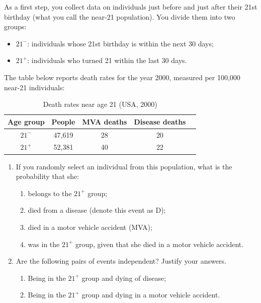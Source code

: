 \documentclass[11pt]{exam}
\begin{document}
\begin{questions}

\question[3]
As a first step, you collect data on individuals just before and just after their 21st birthday (what you call the near-21 population). You divide them into two groups:
\begin{itemize}
    \item \textbf{$21^-$}: individuals whose 21st birthday is within the next 30 days;
    \item \textbf{$21^+$}: individuals who turned 21 within the last 30 days.
\end{itemize}
The table below reports death rates for the year 2000, measured per 100,000 near-21 individuals:
\vspace{-0.2cm}

\begin{table}[ht]
    \centering
    \caption{Death rates near age 21 (USA, 2000)}
    \label{tab:deaths}
    \begin{tabular}{ccccc}
        \toprule
        \textbf{Age group} & \textbf{People} & \textbf{MVA deaths} & \textbf{Disease deaths} \\
        \midrule
        $21^-$ & 47,619 & 28 & 20 \\
        $21^+$ & 52,381 & 40 & 22 \\
        \bottomrule
    \end{tabular}
\end{table}

\begin{enumerate}[label=(\alph*)]
    \item If you randomly select an individual from this population, what is the probability that she:
    \begin{enumerate}[label=(a.\roman*)]
        \item belongs to the $21^+$ group;
        \item died from a disease (denote this event as D);
        \item died in a motor vehicle accident (MVA);
        \item was in the $21^+$ group, given that she died in a motor vehicle accident.
    \end{enumerate}
    
    \item Are the following pairs of events independent? Justify your answers.
    \begin{enumerate}[label=(b.\roman*)]
        \item Being in the $21^+$ group and dying of disease;
        \item Being in the $21^+$ group and dying in a motor vehicle accident.
    \end{enumerate}
    

\end{enumerate}
\end{questions}
\end{document}
